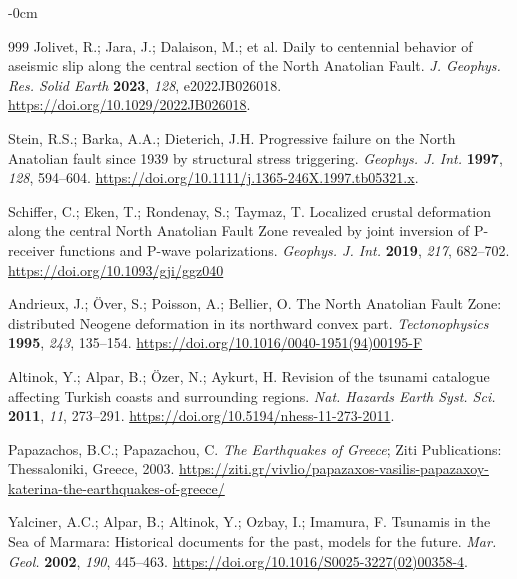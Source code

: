 \documentclass[data,article,accept,pdftex,moreauthors]{Definitions/mdpi}
\begin{document}
\begin{adjustwidth}{-\extralength}{0cm}
\begin{thebibliography}{999}
Jolivet, R.; Jara, J.; Dalaison, M.; et al. Daily to centennial behavior of aseismic slip along the central section of the North Anatolian Fault. \emph{J. Geophys. Res. Solid Earth} \textbf{2023}, \emph{128}, e2022JB026018. \url{https://doi.org/10.1029/2022JB026018}.

Stein, R.S.; Barka, A.A.; Dieterich, J.H. Progressive failure on the North Anatolian fault since 1939 by structural stress triggering. \emph{Geophys. J. Int.} \textbf{1997}, \emph{128}, 594--604. \url{https://doi.org/10.1111/j.1365-246X.1997.tb05321.x}.

Schiffer, C.; Eken, T.; Rondenay, S.; Taymaz, T. Localized crustal deformation along the central North Anatolian Fault Zone revealed by joint inversion of P-receiver functions and P-wave polarizations. \emph{Geophys. J. Int.} \textbf{2019}, \emph{217}, 682--702. \url{https://doi.org/10.1093/gji/ggz040}

Andrieux, J.; {\"O}ver, S.; Poisson, A.; Bellier, O. The North Anatolian Fault Zone: distributed Neogene deformation in its northward convex part. \emph{Tectonophysics} \textbf{1995}, \emph{243}, 135--154. \url{https://doi.org/10.1016/0040-1951(94)00195-F}

Altinok, Y.; Alpar, B.; Özer, N.; Aykurt, H. Revision of the tsunami catalogue affecting Turkish coasts and surrounding regions. \emph{Nat. Hazards Earth Syst. Sci.} \textbf{2011}, \emph{11}, 273--291. \url{https://doi.org/10.5194/nhess-11-273-2011}.

Papazachos, B.C.; Papazachou, C. \emph{The Earthquakes of Greece}; Ziti Publications: Thessaloniki, Greece, 2003. \url{https://ziti.gr/vivlio/papazaxos-vasilis-papazaxoy-katerina-the-earthquakes-of-greece/}

Yalciner, A.C.; Alpar, B.; Altinok, Y.; Ozbay, I.; Imamura, F. Tsunamis in the Sea of Marmara: Historical documents for the past, models for the future. \emph{Mar. Geol.} \textbf{2002}, \emph{190}, 445--463. \url{https://doi.org/10.1016/S0025-3227(02)00358-4}. %


\end{thebibliography}
\end{adjustwidth}
\end{document}
